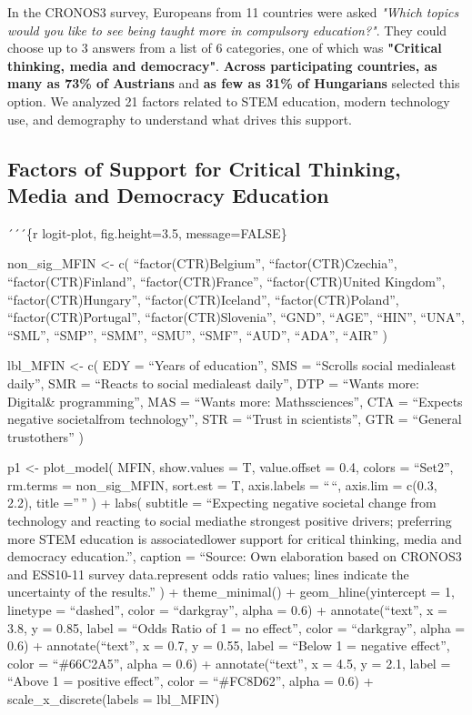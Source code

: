 \documentclass[
]{article}
\begin{document}
\begin{flushleft}
In the CRONOS3 survey, Europeans from 11 countries were asked \textit{"Which topics would you like to see being taught more in compulsory education?"}. They could choose up to 3 answers from a list of 6 categories, one of which was \textbf{"Critical thinking, media and democracy"}. \textcolor{exactgreen}{\textbf{Across participating countries, as many as 73\% of Austrians}} and \textcolor{exactorange}{\textbf{as few as 31\% of Hungarians}} selected this option. We analyzed 21 factors related to STEM education, modern technology use, and demography to understand what drives this support.
\end{flushleft}

\subsection{Factors of Support for Critical Thinking, Media and
Democracy
Education}\label{factors-of-support-for-critical-thinking-media-and-democracy-education}

´´´\{r logit-plot, fig.height=3.5, message=FALSE\}

non\_sig\_MFIN \textless- c( ``factor(CTR)Belgium'',
``factor(CTR)Czechia'', ``factor(CTR)Finland'', ``factor(CTR)France'',
``factor(CTR)United Kingdom'', ``factor(CTR)Hungary'',
``factor(CTR)Iceland'', ``factor(CTR)Poland'', ``factor(CTR)Portugal'',
``factor(CTR)Slovenia'', ``GND'', ``AGE'', ``HIN'', ``UNA'', ``SML'',
``SMP'', ``SMM'', ``SMU'', ``SMF'', ``AUD'', ``ADA'', ``AIR'' )

lbl\_MFIN \textless- c( EDY = ``Years of education\ncompleted'', SMS =
``Scrolls social media\nat least daily'', SMR = ``Reacts to social
media\nat least daily'', DTP = ``Wants more: Digital\ntools \&
programming'', MAS = ``Wants more: Maths\nand sciences'', CTA =
``Expects negative societal\nchange from technology'', STR = ``Trust in
scientists'', GTR = ``General trust\nin others'' )

p1 \textless- plot\_model( MFIN, show.values = T, value.offset = 0.4,
colors = ``Set2'', rm.terms = non\_sig\_MFIN, sort.est = T, axis.labels
= ``\,``, axis.lim = c(0.3, 2.2), title =''\,'' ) + labs( subtitle =
``Expecting negative societal change from technology and reacting to
social media\nare the strongest positive drivers; preferring more STEM
education is associated\nwith lower support for critical thinking, media
and democracy education.'', caption = ``Source: Own elaboration based on
CRONOS3 and ESS10-11 survey data.\nDots represent odds ratio values;
lines indicate the uncertainty of the results.'' ) + theme\_minimal() +
geom\_hline(yintercept = 1, linetype = ``dashed'', color = ``darkgray'',
alpha = 0.6) + annotate(``text'', x = 3.8, y = 0.85, label = ``Odds
Ratio of 1 = no effect'', color = ``darkgray'', alpha = 0.6) +
annotate(``text'', x = 0.7, y = 0.55, label = ``Below 1 = negative
effect'', color = ``\#66C2A5'', alpha = 0.6) + annotate(``text'', x =
4.5, y = 2.1, label = ``Above 1 = positive effect'', color =
``\#FC8D62'', alpha = 0.6) + scale\_x\_discrete(labels = lbl\_MFIN)
\end{document}
